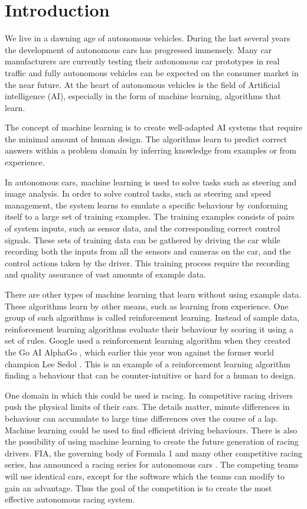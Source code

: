 \chapter{Introduction}
\label{introduction}

We live in a dawning age of autonomous vehicles. During the last several years the development of autonomous cars has progressed immensely. Many car manufacturers are currently testing their autonomous car prototypes in real traffic and fully autonomous vehicles can be expected on the consumer market in the near future. At the heart of autonomous vehicles is the field of Artificial intelligence (AI), especially in the form of machine learning, algorithms that learn.

The concept of machine learning is to create well-adapted AI systems that require the minimal amount of human design. The algorithms learn to predict correct answers within a problem domain by inferring knowledge from examples or from experience. 

In autonomous cars, machine learning is used to solve tasks such as steering and image analysis. In order to solve control tasks, such as steering and speed management, the system learns to emulate a specific behaviour by conforming itself to a large set of training examples. The training examples consists of pairs of system inputs, such as sensor data, and the corresponding correct control signals. These sets of training data can be gathered by driving the car while recording both the inputs from all the sensors and cameras on the car, and the control actions taken by the driver. This training process require the recording and quality assurance of vast amounts of example data.

There are other types of machine learning that learn without using example data. These algorithms learn by other means, such as learning from experience. One group of such algorithms is called reinforcement learning. Instead of sample data, reinforcement learning algorithms evaluate their behaviour by scoring it using a set of rules. Google used a reinforcement learning algorithm when they created the Go AI AlphaGo \cite{gibney}, which earlier this year won against the former world champion Lee Sedol \cite{AlphaGo}. This is an example of a reinforcement learning algorithm finding a behaviour that can be counter-intuitive or hard for a human to design.

One domain in which this could be used is racing. In competitive racing drivers push the physical limits of their cars. The details matter, minute differences in behaviour can accumulate to large time differences over the course of a lap. Machine learning could be used to find efficient driving behaviours. There is also the possibility of using machine learning to create the future generation of racing drivers. FIA, the governing body of Formula 1 and many other competitive racing series, has announced a racing series for autonomous cars \cite{roborace}. The competing teams will use identical cars, except for the software which the teams can modify to gain an advantage. Thus the goal of the competition is to create the most effective autonomous racing system. 

